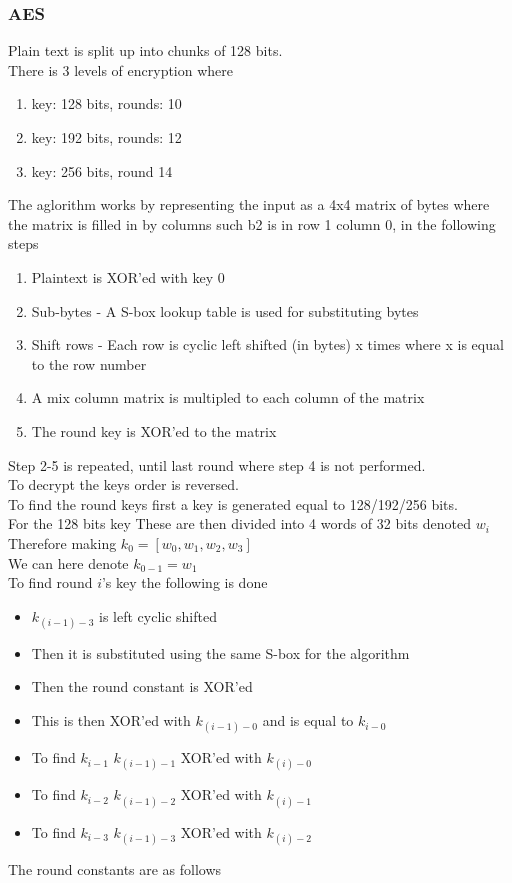 \documentclass[12pt, a4paper]{article}
\begin{document}
			\subsubsection{AES}
				Plain text is split up into chunks of 128 bits.\\
				There is 3 levels of encryption where 
				\begin{enumerate}
					\item key: 128 bits, rounds: 10
					\item key: 192 bits, rounds: 12
					\item key: 256 bits, round 14
				\end{enumerate}
				The aglorithm works by representing the input as a 4x4 matrix of bytes where the matrix is filled in by columns such b2 is in row 1 column 0, in the following steps
				\begin{enumerate}
					\item Plaintext is XOR'ed with key 0
					\item Sub-bytes - A S-box lookup table is used for substituting bytes
					\item Shift rows - Each row is cyclic left shifted (in bytes) x times where x is equal to the row number 
					\item A mix column matrix is multipled to each column of the matrix
					\item The round key is XOR'ed to the matrix
				\end{enumerate}
				Step 2-5 is repeated, until last round where step 4 is not performed.\\
				To decrypt the keys order is reversed.\\[4mm]
				To find the round keys first a key is generated equal to 128/192/256 bits.\\
				For the 128 bits key
				These are then divided into 4 words of 32 bits denoted $w_i$\\
				Therefore making $k_0=[w_0,w_1,w_2,w_3]$\\
				We can here denote $k_{0-1}=w_1$\\
				To find round $i$'s key the following is done
				\begin{itemize}
					\item $k_{(i-1) - 3}$ is left cyclic shifted
					\item Then it is substituted using the same S-box for the algorithm
					\item Then the round constant is XOR'ed
					\item This is then XOR'ed with $k_{(i-1)-0}$ and is equal to $k_{i-0}$
					\item To find $k_{i-1}$ $k_{(i-1)-1}$ XOR'ed with $k_{(i)-0}$ 
					\item To find $k_{i-2}$ $k_{(i-1)-2}$ XOR'ed with $k_{(i)-1}$ 
					\item To find $k_{i-3}$ $k_{(i-1)-3}$ XOR'ed with $k_{(i)-2}$ 
				\end{itemize}
				The round constants are as follows
\end{document}
